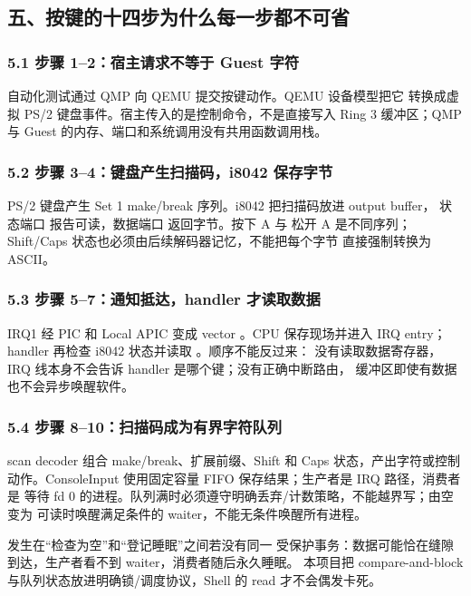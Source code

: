 \subsection{五、按键的十四步为什么每一步都不可省}

\subsubsection{5.1 步骤 1--2：宿主请求不等于 Guest 字符}

自动化测试通过 QMP  向 QEMU 提交按键动作。QEMU 设备模型把它
转换成虚拟 PS/2 键盘事件。宿主传入的是控制命令，不是直接写入 Ring 3
缓冲区；QMP 与 Guest 的内存、端口和系统调用没有共用函数调用栈。

\subsubsection{5.2 步骤 3--4：键盘产生扫描码，i8042 保存字节}

PS/2 键盘产生 Set 1 make/break 序列。i8042 把扫描码放进 output buffer，
状态端口  报告可读，数据端口  返回字节。按下 A 与
松开 A 是不同序列；Shift/Caps 状态也必须由后续解码器记忆，不能把每个字节
直接强制转换为 ASCII。

\subsubsection{5.3 步骤 5--7：通知抵达，handler 才读取数据}

IRQ1 经 PIC 和 Local APIC 变成 vector 。CPU 保存现场并进入
IRQ entry；handler 再检查 i8042 状态并读取 。顺序不能反过来：
没有读取数据寄存器，IRQ 线本身不会告诉 handler 是哪个键；没有正确中断路由，
缓冲区即使有数据也不会异步唤醒软件。

\subsubsection{5.4 步骤 8--10：扫描码成为有界字符队列}

scan decoder 组合 make/break、扩展前缀、Shift 和 Caps 状态，产出字符或控制
动作。ConsoleInput 使用固定容量 FIFO 保存结果；生产者是 IRQ 路径，消费者是
等待 fd 0 的进程。队列满时必须遵守明确丢弃/计数策略，不能越界写；由空变为
可读时唤醒满足条件的 waiter，不能无条件唤醒所有进程。

发生在“检查为空”和“登记睡眠”之间若没有同一
受保护事务：数据可能恰在缝隙到达，生产者看不到 waiter，消费者随后永久睡眠。
本项目把 compare-and-block 与队列状态放进明确锁/调度协议，Shell 的 read
才不会偶发卡死。

